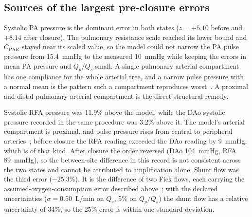 \documentclass{article}
\begin{document}
\subsection{Sources of the largest pre-closure errors}
Systolic PA pressure is the dominant error in both states ($z = +5.10$ before and $+8.14$ after closure). The pulmonary resistance scale reached its lower bound and $C_{\mathrm{PAR}}$ stayed near its scaled value, so the model could not narrow the PA pulse pressure from 15.4~mmHg to the measured 10~mmHg while keeping the errors in mean PA pressure and $Q_p/Q_s$ small. A single pulmonary arterial compartment has one compliance for the whole arterial tree, and a narrow pulse pressure with a normal mean is the pattern such a compartment reproduces worst~\cite{Colunga2023,Kempton2025}. A proximal and distal pulmonary arterial compartment is the direct structural remedy.

Systolic RFA pressure was 11.9\% above the model, while the DAo systolic pressure recorded in the same procedure was 3.2\% above it. The model's arterial compartment is proximal, and pulse pressure rises from central to peripheral arteries~\cite{FloresGeronimo2021}; before closure the RFA reading exceeded the DAo reading by 9~mmHg, which is of that kind. After closure the order reversed (DAo 104~mmHg, RFA 89~mmHg), so the between-site difference in this record is not consistent across the two states and cannot be attributed to amplification alone. Shunt flow was the third error ($-25.3\%$). It is the difference of two Fick flows, each carrying the assumed-oxygen-consumption error described above~\cite{Ralston2023}; with the declared uncertainties ($\sigma = 0.50$~L/min on $Q_s$, 5\% on $Q_p/Q_s$) the shunt flow has a relative uncertainty of 34\%, so the 25\% error is within one standard deviation.
\end{document}
